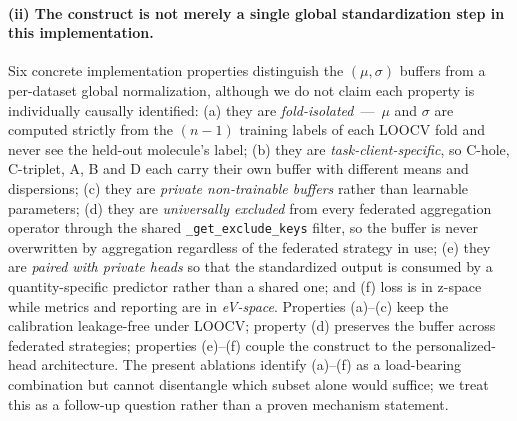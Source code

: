\documentclass[11pt,a4paper]{article}
\begin{document}
\paragraph{(ii) The construct is not merely a single global standardization step in this implementation.} Six concrete implementation properties distinguish the $(\mu, \sigma)$ buffers from a per-dataset global normalization, although we do not claim each property is individually causally identified: (a) they are \emph{fold-isolated}~---~$\mu$ and $\sigma$ are computed strictly from the $(n-1)$ training labels of each LOOCV fold and never see the held-out molecule's label; (b) they are \emph{task-client-specific}, so C-hole, C-triplet, A, B and D each carry their own buffer with different means and dispersions; (c) they are \emph{private non-trainable buffers} rather than learnable parameters; (d) they are \emph{universally excluded} from every federated aggregation operator through the shared \texttt{\_get\_exclude\_keys} filter, so the buffer is never overwritten by aggregation regardless of the federated strategy in use; (e) they are \emph{paired with private heads} so that the standardized output is consumed by a quantity-specific predictor rather than a shared one; and (f) loss is in z-space while metrics and reporting are in \emph{eV-space}. Properties (a)--(c) keep the calibration leakage-free under LOOCV; property (d) preserves the buffer across federated strategies; properties (e)--(f) couple the construct to the personalized-head architecture. The present ablations identify (a)--(f) as a load-bearing combination but cannot disentangle which subset alone would suffice; we treat this as a follow-up question rather than a proven mechanism statement.
\end{document}
